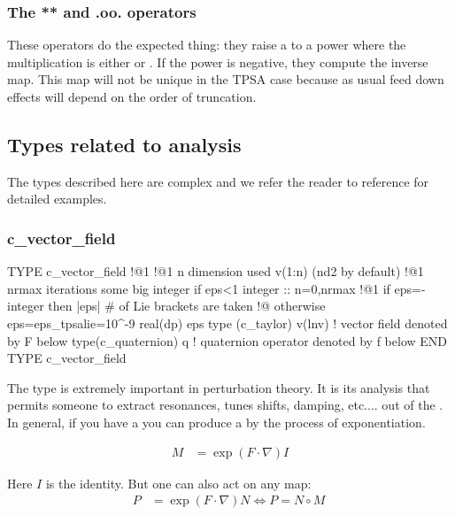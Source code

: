 \documentclass[english,12pt,article]{article} %
\begin{document}
{{{\subsubsection{The ** and .oo. operators} \label{sec:powers}


These operators do the expected thing: they raise a  to a power where the multiplication is either \vn{*} or . If the power is negative, they compute the inverse map. This map will not be unique in the TPSA case  because as usual feed down effects will depend on the order of truncation.

\subsection{Types related to analysis} \label{sec:analysis}

The types described here are complex and we refer the reader to reference \cite{thebook2} for detailed examples.

\subsubsection{c_vector_field} \label{sec:analysis}

  \begin{example1}
  TYPE c_vector_field  !@1
   !@1 n dimension used v(1:n) (nd2 by default)
   !@1 nrmax iterations some big integer if eps<1  
   integer :: n=0,nrmax
   !@1 if eps=-integer  then |eps| # of Lie brackets are taken 
   !@ otherwise eps=eps_tpsalie=10^-9
   real(dp) eps
   type (c_taylor) v(lnv)   ! vector field denoted by F below
   type(c_quaternion) q   ! quaternion operator denoted by f below
  END TYPE c_vector_field
   \end{example1} 
  
  The type  is extremely important in perturbation theory. It is its analysis that permits someone to extract resonances, tunes shifts, damping, etc.... out of the .  In general, if you have a    you can produce a  by the process of exponentiation.
  
\begin{align} M&=\exp\left({F\cdot \nabla }\right)I \end{align}

Here $I$ is the identity.  But one can also act on any map:
%
\begin{align} P&=\exp\left({F\cdot \nabla }\right)N \Longleftrightarrow P=
N\circ M\ \label{eqconc}\end{align}



}}}
\end{document}
